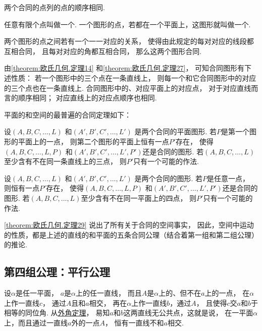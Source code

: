 \begin{theorem}\label{theorem:欧氏几何.定理27}
两个合同的点列的点的顺序相同.
\end{theorem}

\begin{definition}
任意有限个点叫做一个.
一个图形的点，若都在一个平面上，这图形就叫做一个.
\end{definition}

两个图形的点之间若有一个一一对应的关系，
使得由此规定的每对对应的线段都互相合同，
且每对对应的角都互相合同，
那么这两个图形合同.

由\cref{theorem:欧氏几何.定理14}
和\cref{theorem:欧氏几何.定理27}，
可知合同图形有下述性质：
若一个图形中的三个点在一条直线上，
则每一个和它合同图形中的对应的三个点也在一条直线上.
合同图形中的、对应平面上的对应点，
对于对应直线而言的顺序相同；
对应直线上的对应点顺序也相同.

平面的和空间的最普遍的合同定理如下：
\begin{theorem}\label{theorem:欧氏几何.定理28}
设\((A,B,C,\dotsc,L)\)
和\((A',B',C',\dotsc,L')\)
是两个合同的平面图形.
若\(P\)是第一个图形的平面上的一点，
则第二个图形的平面上恒有一点\(P'\)存在，
使得\((A,B,C,\dotsc,L,P)\)
和\((A',B',C',\dotsc,L',P')\)还是合同的图形.
若\((A,B,C,\dotsc,L)\)至少含有不在同一条直线上的三点，
则\(P'\)只有一个可能的作法.
\end{theorem}

\begin{theorem}\label{theorem:欧氏几何.定理29}
设\((A,B,C,\dotsc,L)\)
和\((A',B',C',\dotsc,L')\)
是两个合同的图形.
若\(P\)是任意一点，
则恒有一点\(P'\)存在，
使得\((A,B,C,\dotsc,L,P)\)
和\((A',B',C',\dotsc,L',P')\)还是合同的图形.
若\((A,B,C,\dotsc,L)\)至少含有不在同一平面上的四点，
则\(P'\)只有一个可能的作法.
\end{theorem}

\cref{theorem:欧氏几何.定理29} 说出了所有关于合同的空间事实，
因此，空间中运动的性质，都是上述的直线的和平面的五条合同公理（结合着第一组和第二组公理）的推论.

\subsection{第四组公理：平行公理}
设\(\alpha\)是任一平面，
\(a\)是\(\alpha\)上的任一直线，
而且\(A\)是\(\alpha\)上的、但不在\(a\)上的一点，
在\(\alpha\)上作一直线\(c\)，
通过\(A\)且和\(a\)相交，
再在\(\alpha\)上作一直线\(b\)，通过\(A\)，
且使得\(c\)交\(a\)和\(b\)于相等的同位角.
从\hyperref[theorem:欧氏几何.定理22]{外角定理}，
易知\(a\)和\(b\)这两直线无公共点，这就是说，
在一平面\(\alpha\)上，而且通过一直线\(a\)外的一点\(A\)，
恒有一直线不和\(a\)相交.

